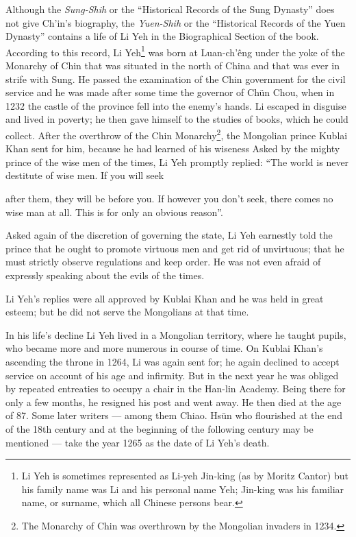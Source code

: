 \documentclass[11pt]{article}
\newcommand{\scanpage}[2]{\clearpage\setcounter{footnote}{0}\noindent{\footnotesize\color{gray}PDF page #1 · #2}\par\medskip}
\newcommand{\scanfooter}{}
\begin{document}
Although the \emph{Sung-Shih} or the ``Historical Records of the Sung Dynasty'' does not give Ch'in's biography, the \emph{Yuen-Shih} or the ``Historical Records of the Yuen Dynasty'' contains a life of Li Yeh in the Biographical Section of the book. According to this record, Li Yeh\footnote{Li Yeh is sometimes represented as Li-yeh Jin-king (as by Moritz Cantor) but his family name was Li and his personal name Yeh; Jin-king was his familiar name, or surname, which all Chinese persons bear.} was born at Luan-ch'êng under the yoke of the Monarchy of Chin that was situated in the north of China and that was ever in strife with Sung. He passed the examination of the Chin government for the civil service and he was made after some time the governor of Chün Chou, when in 1232 the castle of the province fell into the enemy's hands. Li escaped in disguise and lived in poverty; he then gave himself to the studies of books, which he could collect. After the overthrow of the Chin Monarchy\footnote{The Monarchy of Chin was overthrown by the Mongolian invaders in 1234.}, the Mongolian prince Kublai Khan sent for him, because he had learned of his wiseness Asked by the mighty prince of the wise men of the times, Li Yeh promptly replied: ``The world is never destitute of wise men. If you will seek
\scanfooter

\scanpage{0094}{Chapter 12, printed page 80}
after them, they will be before you. If however you don't seek, there comes no wise man at all. This is for only an obvious reason''.

Asked again of the discretion of governing the state, Li Yeh earnestly told the prince that he ought to promote virtuous men and get rid of unvirtuous; that he must strictly observe regulations and keep order. He was not even afraid of expressly speaking about the evils of the times.

Li Yeh's replies were all approved by Kublai Khan and he was held in great esteem; but he did not serve the Mongolians at that time.

In his life's decline Li Yeh lived in a Mongolian territory, where he taught pupils, who became more and more numerous in course of time. On Kublai Khan's ascending the throne in 1264, Li was again sent for; he again declined to accept service on account of his age and infirmity. But in the next year he was obliged by repeated entreaties to occupy a chair in the Han-lin Academy. Being there for only a few months, he resigned his post and went away. He then died at the age of 87. Some later writers --- among them Chiao. Hsün who flourished at the end of the 18th century and at the beginning of the following century may be mentioned --- take the year 1265 as the date of Li Yeh's death.
\end{document}

